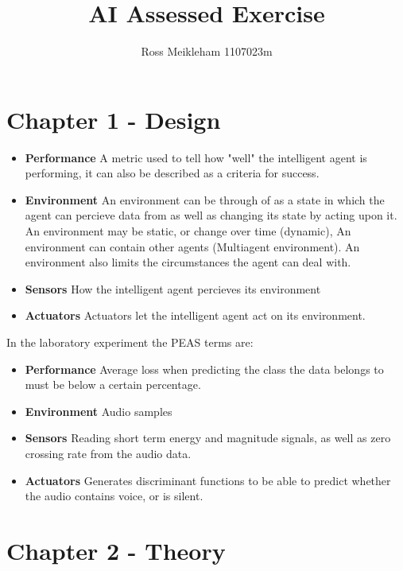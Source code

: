 \documentclass[a4paper]{article}
\begin{document}
\title{AI Assessed Exercise}

\author{Ross Meikleham 1107023m}

\maketitle


\section{Chapter 1 - Design}

\begin{itemize}
\item \textbf{Performance} \- A metric used to tell how "well" the intelligent agent
is performing, it can also be described as a criteria for success. 
\item \textbf{Environment} \- An environment can be through of as a state in which
the agent can percieve data from as well as changing its state by acting upon it. 
An environment may be static, or change over time (dynamic), An environment can contain other agents (Multiagent environment).
An environment also limits the circumstances the agent can deal with.  
\item \textbf{Sensors} \- How the intelligent agent percieves its environment 
\item \textbf{Actuators} \- Actuators let the intelligent agent act on its environment.
\end{itemize}

In the laboratory experiment the PEAS terms are:
\begin{itemize}
\item \textbf{Performance} \- Average loss when predicting the class the data belongs to must
be below a certain percentage.
\item \textbf{Environment} \- Audio samples
\item \textbf{Sensors} \- Reading short term energy and magnitude signals, as well as
zero crossing rate from the audio data.
\item \textbf{Actuators} \-  Generates discriminant functions to be able
to predict whether the audio contains voice, or is silent. 
\end{itemize}

\section{Chapter 2 - Theory}
\end{document}
